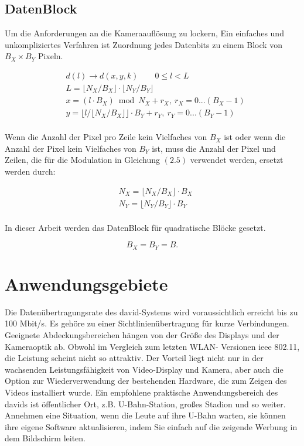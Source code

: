 \subsection{DatenBlock}

Um die Anforderungen an die Kameraauflösung zu lockern, Ein einfaches und unkompliziertes Verfahren ist Zuordnung jedes Datenbits zu einem Block von $B_X \times B_Y$ Pixeln.

\begin{equation}
\begin{split}
  & d(l)\rightarrow d(x,y,k) \qquad 0\le l <L \\
  & L=\lfloor N_X/B_X \rfloor \cdot \lfloor N_Y/B_Y \rfloor \\
  & x=(l \cdot B_X) \bmod N_X +r_X, \ r_X =0...(B_X -1) \\
  & y=\lfloor l / \lfloor N_X/B_X \rfloor \rfloor \cdot B_Y +r_Y, \ r_Y =0...(B_Y -1) \\
\end{split}
\end{equation}

Wenn die Anzahl der Pixel pro Zeile kein Vielfaches von $B_X$ ist oder wenn die Anzahl der Pixel kein Vielfaches von $B_Y$ ist, muss die Anzahl der Pixel und Zeilen, die für die Modulation in Gleichung $\left(2.5\right)$ verwendet werden, ersetzt werden durch:

\begin{equation}
\begin{split}
  & N_X = \lfloor N_X/B_X \rfloor \cdot B_X\\ 
  & N_Y = \lfloor N_Y/B_Y \rfloor \cdot B_Y\\ 
\end{split}
\end{equation}

In dieser Arbeit werden das DatenBlock für quadratische Blöcke gesetzt.

\begin{equation}
   B_X = B_Y = B.
\end{equation}


\section{Anwendungsgebiete} 

Die Datenübertragungsrate des \gls{david}-Systems wird voraussichtlich erreicht bis zu 100 Mbit/s. Es gehöre	zu einer Sichtlinienübertragung für kurze Verbindungen. Geeignete Abdeckungsbereichen hängen von der Größe des Displays und der Kameraoptik ab. Obwohl im Vergleich zum letzten WLAN- Versionen \gls{ieee} 802.11, die Leistung scheint nicht so attraktiv. Der Vorteil liegt nicht nur in der wachsenden Leistungsfähigkeit von Video-Display und Kamera, aber auch die Option zur Wiederverwendung der bestehenden Hardware, die zum Zeigen des Videos installiert wurde. Ein empfohlene praktische Anwendungsbereich des \gls{david}s ist öffentlicher Ort, z.B. U-Bahn-Station, großes Stadion und so weiter. Annehmen eine Situation, wenn die Leute auf ihre U-Bahn warten, sie können ihre eigene Software aktualisieren, indem Sie einfach auf die zeigende Werbung in dem Bildschirm leiten.


